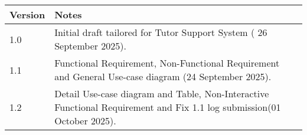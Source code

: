 \begin{longtable}{p{3cm}p{11cm}}
\toprule
\textbf{Version} & \textbf{Notes} \\
\midrule
1.0 & Initial draft tailored for Tutor Support System ( 26 September 2025). \\

1.1 & Functional Requirement, Non-Functional Requirement and General Use-case diagram (24 September 2025).\\

1.2 & Detail Use-case diagram and Table, Non-Interactive Functional Requirement and Fix 1.1 log submission(01 October 2025).\\

\bottomrule
\end{longtable}
